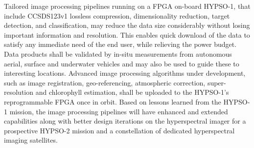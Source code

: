 Tailored image processing pipelines running on a FPGA on-board HYPSO-1, that include CCSDS123v1 lossless compression, dimensionality reduction, target detection, and classification, may reduce the data size considerably without losing important information and resolution. This enables quick download of the data to satisfy any immediate need of the end user, while relieving the power budget. Data products shall be validated by in-situ measurements from autonomous aerial, surface and underwater vehicles and may also be used to guide these to interesting locations. Advanced image processing algorithms under development, such as image registration, geo-referencing, atmospheric correction, super-resolution and chlorophyll estimation, shall be uploaded to the HYPSO-1's reprogrammable FPGA once in orbit. Based on lessons learned from the HYPSO-1 mission, the image processing pipelines will have enhanced and extended capabilities along with better design iterations on the hyperspectral imager for a prospective HYPSO-2 mission and a constellation of dedicated hyperspectral imaging satellites. 